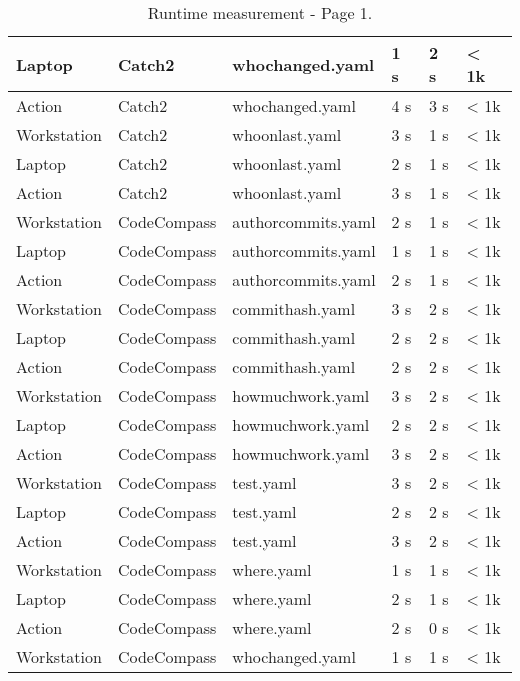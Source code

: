 \begin{table}[H]
\begin{tabular}{ | m{} | m{} | m{} | m{} | m{} | m{} | }
		\hline
		Laptop & Catch2 & whochanged.yaml & 1 s & 2 s & < 1k \\ 
		\hline
		Action & Catch2 & whochanged.yaml & 4 s & 3 s & < 1k \\ 
		\hline
		Workstation & Catch2 & whoonlast.yaml & 3 s & 1 s & < 1k \\ 
		\hline
		Laptop & Catch2 & whoonlast.yaml & 2 s & 1 s & < 1k \\ 
		\hline
		Action & Catch2 & whoonlast.yaml & 3 s & 1 s & < 1k \\ 
		\hline
		Workstation & CodeCompass & authorcommits.yaml & 2 s & 1 s & < 1k \\ 
		\hline
		Laptop & CodeCompass & authorcommits.yaml & 1 s & 1 s & < 1k \\ 
		\hline
		Action & CodeCompass & authorcommits.yaml & 2 s & 1 s & < 1k \\ 
		\hline
		Workstation & CodeCompass & commithash.yaml & 3 s & 2 s & < 1k \\ 
		\hline
		Laptop & CodeCompass & commithash.yaml & 2 s & 2 s & < 1k \\ 
		\hline
		Action & CodeCompass & commithash.yaml & 2 s & 2 s & < 1k \\ 
		\hline
		Workstation & CodeCompass & howmuchwork.yaml & 3 s & 2 s & < 1k \\ 
		\hline
		Laptop & CodeCompass & howmuchwork.yaml & 2 s & 2 s & < 1k \\ 
		\hline
		Action & CodeCompass & howmuchwork.yaml & 3 s & 2 s & < 1k \\ 
		\hline
		Workstation & CodeCompass & test.yaml & 3 s & 2 s & < 1k \\ 
		\hline
		Laptop & CodeCompass & test.yaml & 2 s & 2 s & < 1k \\ 
		\hline
		Action & CodeCompass & test.yaml & 3 s & 2 s & < 1k \\ 
		\hline
		Workstation & CodeCompass & where.yaml & 1 s & 1 s & < 1k \\ 
		\hline
		Laptop & CodeCompass & where.yaml & 2 s & 1 s & < 1k \\ 
		\hline
		Action & CodeCompass & where.yaml & 2 s & 0 s & < 1k \\ 
		\hline
		Workstation & CodeCompass & whochanged.yaml & 1 s & 1 s & < 1k \\ 
		\hline
	\end{tabular}
	\caption{Runtime measurement - Page 1.}
	\label{tab:mes-2}
\end{table}

